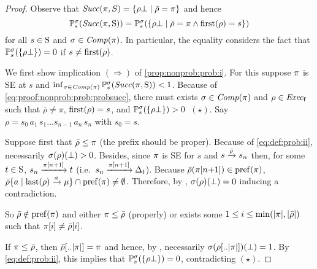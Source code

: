 \begin{proof}
  Observe that
  $\Succ(\plan,S) = \{{\rho\complete}\mid{\bar{\rho}=\plan}\}$
  and hence
  \begin{equation}\label{eq:proof:nonprob:prob:probsucc}
    \textstyle
    \Prob^\strat_s(\Succ(\plan,\S)) =
    \Prob^\strat_s(\{{\rho\complete}\mid{\bar{\rho}=\plan}\wedge{\first(\rho)=s}\})
  \end{equation}
  for all $s\in\S$ and $\strat\in\Comp(\plan)$. In particular, the
  equality considers the fact that
  $\Prob^\strat_s(\{\rho\complete\})=0$ if $s\neq\first(\rho)$.

  We first show implication $(\Rightarrow)$ of
  \cref{prop:nonprob:prob:i}.
  For this suppose $\plan$ is SE at $s$ and
  $\inf_{\strat\in\Comp(\plan)}\Prob^\strat_s(\Succ(\plan,\S))<1$.
  Because of \cref{eq:proof:nonprob:prob:probsucc}, there must exists
  $\strat\in\Comp(\plan)$ and $\rho\in\execf$ such that
  $\bar{\rho}\neq\pi$, $\first(\rho)=s$, and
  $\Prob^\strat_s(\{\rho\complete\})>0$~$(\star)$.
  Say $\rho=s_0\, a_1\, s_1\ldots s_{n-1}\, a_n\, s_n$ with $s_0=s$.

  Suppose first that $\bar{\rho}\leq\plan$ (the prefix should be
  proper).  Because of \cref{eq:def:prob:ii}, necessarily
  $\strat(\rho)(\complete) > 0$.  Besides, since $\plan$ is SE for $s$
  and $s\reach{\bar{\rho}}s_n$ then, for some $t\in\S$,
  $s_n\reach{\plan[n{+}1]}t$ (i.e.\ $s_n\reach{\plan[n{+}1]}\Dirac_t$).
  Because $\bar{\rho}(\plan[n{+}1])\in\pref(\plan)$,
  $\bar{\rho}\{a\mid{\last(\rho)\reach{a}\mu}\}\cap\pref(\plan)\neq\emptyset$.
  Therefore, by , $\strat(\rho)(\complete) = 0$
  inducing a contradiction.

  So $\bar{\rho}\notin\pref(\plan)$ and either $\plan\leq\bar{\rho}$
  (properly) or exists some $1\leq i \leq\min(\size{\plan},\size{\bar{\rho}})$
  such that $\plan[i]\neq\bar{\rho}[i]$.

  If $\plan\leq\bar{\rho}$, then $\bar{\rho}[..\size{\plan}]=\plan$ and
  hence, by , necessarily
  $\strat(\rho[..\size{\plan}])(\complete) = 1$.  By \cref{eq:def:prob:ii},
  this implies that $\Prob^\strat_s(\{\rho\complete\})=0$,
  contradicting $(\star)$.


\end{proof}
